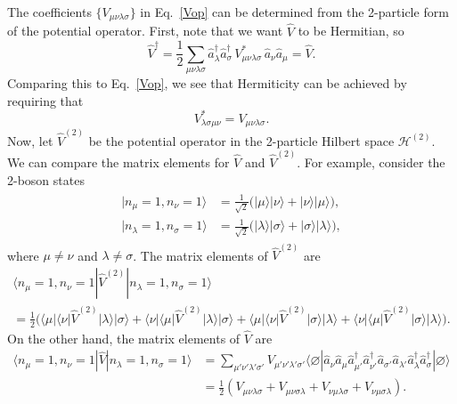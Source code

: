 \documentclass[prx,12pt]{revtex4-2}
\begin{document}
The coefficients $\{ V_{\mu\nu\lambda\sigma} \}$ in Eq.~\eqref{Vop}
can be determined from the 2-particle form of the potential operator.
First, note that we want $\hat{V}$ to be Hermitian, so
\begin{equation}
  \hat{V}^\dagger = \frac{1}{2}
  \sum_{\mu\nu\lambda\sigma} \hat{a}^\dagger_\lambda \hat{a}^\dagger_\sigma
  \, V_{\mu\nu\lambda\sigma}^* \, \hat{a}_\nu \hat{a}_\mu = \hat{V}.
\end{equation}
Comparing this to Eq.~\eqref{Vop}, we see that Hermiticity can be
achieved by requiring that
\begin{equation}
  V_{\lambda\sigma\mu \nu}^* = V_{\mu\nu\lambda\sigma}.
\end{equation}
Now, let $\hat{V}^{(2)}$ be the potential operator in the 2-particle
Hilbert space $\mathscr{H}^{(2)}$.  We can compare the matrix elements
for $\hat{V}$ and $\hat{V}^{(2)}$.  For example, consider the 2-boson
states
\begin{align}
  \begin{aligned}
    |n_\mu = 1, n_\nu = 1\rangle &= \frac{1}{\sqrt{2}}
      \Big(|\mu\rangle|\nu\rangle + |\nu\rangle|\mu\rangle \Big), \\
    |n_\lambda = 1, n_\sigma = 1\rangle &= \frac{1}{\sqrt{2}}
      \Big(|\lambda\rangle|\sigma\rangle + |\sigma\rangle|\lambda\rangle \Big),
  \end{aligned}
\end{align}
where $\mu \ne \nu$ and $\lambda \ne \sigma$.  The matrix elements of
$\hat{V}^{(2)}$ are
\begin{multline}
  \langle n_\mu = 1, n_\nu = 1 | \hat{V}^{(2)} |n_\lambda = 1, n_\sigma = 1\rangle \\
  = \frac{1}{2} \Big(
  \langle\mu|\langle\nu|\hat{V}^{(2)}|\lambda\rangle|\sigma\rangle
  + \langle\nu|\langle\mu|\hat{V}^{(2)}|\lambda\rangle|\sigma\rangle
  + \langle\mu|\langle\nu|\hat{V}^{(2)}|\sigma\rangle|\lambda\rangle
  + \langle\nu|\langle\mu|\hat{V}^{(2)}|\sigma\rangle|\lambda\rangle
  \Big).
  \label{mat0}
\end{multline}
On the other hand, the matrix elements of $\hat{V}$ are
\begin{align}
  \langle n_\mu = 1, n_\nu = 1 | \hat{V} |n_\lambda = 1, n_\sigma = 1\rangle
  &= \sum_{\mu'\nu'\lambda'\sigma'} V_{\mu'\nu'\lambda'\sigma'}
  \langle \varnothing | \hat{a}_\nu \hat{a}_\mu \hat{a}_{\mu'}^\dagger
  \hat{a}_{\nu'}^\dagger \hat{a}_{\sigma'} \hat{a}_{\lambda'}
  \hat{a}_\lambda^\dagger \hat{a}_\sigma^\dagger |\varnothing\rangle \label{mat1}\\
  &= \frac{1}{2} \left(V_{\mu\nu\lambda\sigma}
  + V_{\mu\nu\sigma\lambda}
  + V_{\nu\mu\lambda\sigma}
  + V_{\nu\mu\sigma\lambda} \label{mat2}
  \right).
\end{align}
\end{document}
